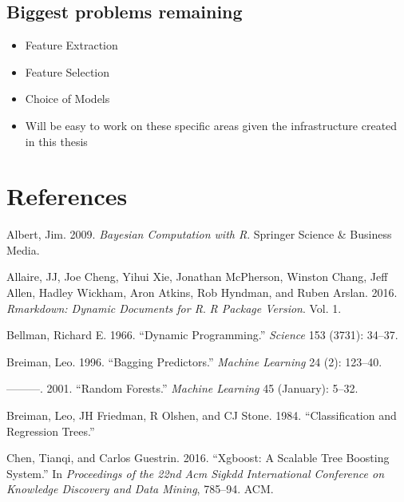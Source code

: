 \documentclass[
  11pt,
  a4paper,
  DIV=12,captions=tableheading,oneside,titlepage=firstiscover,abstracton]{scrreprt}
\begin{document}
\hypertarget{biggest-problems-remaining}{%
\section{Biggest problems remaining}\label{biggest-problems-remaining}}

\begin{itemize}
\item
  Feature Extraction
\item
  Feature Selection
\item
  Choice of Models
\item
  Will be easy to work on these specific areas given the infrastructure created in this thesis
\end{itemize}

\hypertarget{references}{%
\chapter*{References}\label{references}}

\hypertarget{refs}{}
\leavevmode\hypertarget{ref-albert2009bayesian}{}%
Albert, Jim. 2009. \emph{Bayesian Computation with R}. Springer Science \& Business Media.

\leavevmode\hypertarget{ref-allaire2016rmarkdown}{}%
Allaire, JJ, Joe Cheng, Yihui Xie, Jonathan McPherson, Winston Chang, Jeff Allen, Hadley Wickham, Aron Atkins, Rob Hyndman, and Ruben Arslan. 2016. \emph{Rmarkdown: Dynamic Documents for R}. \emph{R Package Version}. Vol. 1.

\leavevmode\hypertarget{ref-bellman1966dynamic}{}%
Bellman, Richard E. 1966. ``Dynamic Programming.'' \emph{Science} 153 (3731): 34--37.

\leavevmode\hypertarget{ref-breiman1996bagging}{}%
Breiman, Leo. 1996. ``Bagging Predictors.'' \emph{Machine Learning} 24 (2): 123--40.

\leavevmode\hypertarget{ref-breiman2001rf}{}%
---------. 2001. ``Random Forests.'' \emph{Machine Learning} 45 (January): 5--32.

\leavevmode\hypertarget{ref-breiman1984classification}{}%
Breiman, Leo, JH Friedman, R Olshen, and CJ Stone. 1984. ``Classification and Regression Trees.''

\leavevmode\hypertarget{ref-chen2016xgboost}{}%
Chen, Tianqi, and Carlos Guestrin. 2016. ``Xgboost: A Scalable Tree Boosting System.'' In \emph{Proceedings of the 22nd Acm Sigkdd International Conference on Knowledge Discovery and Data Mining}, 785--94. ACM.
\end{document}
